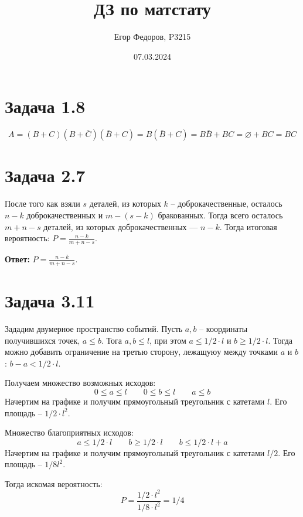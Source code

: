 \documentclass{article}
\title{ДЗ по матстату}
\author{Егор Федоров, P3215}
\date{07.03.2024}
\begin{document}
\maketitle

\section{Задача 1.8}
\[
	A =
	(B + C) (B + \bar C) (\bar B + C) =
	B (\bar B + C) =
	B \bar B + B C =
	\varnothing + B C =
	B C
\]
\section{Задача 2.7}

После того как взяли \(s\) деталей, из которых \(k\) -- доброкачественные,
осталось \(n - k\) доброкачественных и \(m - (s - k)\) бракованных.
Тогда всего осталось \(m + n - s\) деталей, из которых
доброкачественных --- \( n-k \).
Тогда итоговая вероятность: \(P = \frac{n-k}{m+n-s}\).

\textbf{Ответ:} \(P = \frac{n-k}{m+n-s}\).

\section{Задача 3.11}
Зададим двумерное пространство событий.
Пусть \(a, b\) -- координаты получившихся точек, \(a \leq b\).
Тога \(a, b \leq l\), при этом \(a \leq 1/2 \cdot l \) и
\(b \geq 1/2 \cdot l\).
Тогда можно добавить ограничение на третью сторону, лежащуюу
между точками \(a\) и \(b\): \( b - a < 1/2 \cdot l \).

Получаем множество возможных исходов:
\[
	0 \leq a \leq l \qquad 0 \leq b \leq l \qquad
	a \leq b
\]
Начертим на графике и получим прямоугольный треугольник
с катетами \(l\).
Его площадь -- \( 1/2 \cdot l^2 \).

Множество благоприятных исходов:
\[
	a \leq 1/2 \cdot l
	\qquad
	b \geq 1/2 \cdot l
	\qquad
	b \leq 1/2 \cdot l + a
\]
Начертим на графике и получим прямоугольный треугольник
с катетами \(l/2\). Его площадь -- \(1/8 l^2\).

Тогда искомая вероятность:
\[
	P = \frac{1/2 \cdot l^2}{1/8 \cdot l^2} = 1/4
\]
\end{document}
